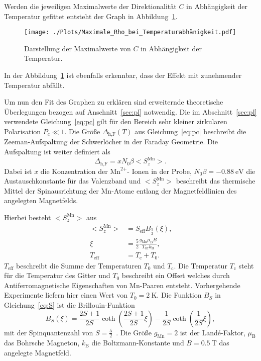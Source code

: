 Werden die jeweiligen Maximalwerte der Direktionalität $C$ in Abhängigkeit
der Temperatur gefittet entsteht der Graph in Abbildung~\ref{fig:fit}.
\begin{figure}
    \centering
    \texttt{[image: ./Plots/Maximale\_Rho\_bei\_Temperaturabhänigkeit.pdf]}
    \caption{Darstellung der Maximalwerte von $C$ in Abhängigkeit der Temperatur.}
    \label{fig:fit}
\end{figure}
\FloatBarrier

In der Abbildung~\ref{fig:fit} ist ebenfalls erkennbar, 
dass der Effekt mit zunehmender Temperatur abfällt.

Um nun den Fit des Graphen zu erklären
sind erweiternde theoretische Überlegungen bezogen auf Anschnitt~\ref{sec:pl} notwendig.
Die im Abschnitt~\ref{sec:pl} verwendete Gleichung~\ref{eq:pc} gilt für den Bereich sehr kleiner zirkularen Polarisation $P_{c}\ll 1$. 
Die Größe $\Delta_\text{h,F}(T)$ aus Gleichung~\ref{eq:pc} beschreibt die 
Zeeman-Aufspaltung der Schwerlöcher in der Faraday Geometrie.
Die Aufspaltung ist weiter definiert als 
\begin{equation}
    \Delta_\text{h,F} = xN_0\beta \bigl< S^\text{Mn}_{z} \bigr>.
\end{equation}
Dabei ist $x$ die Konzentration der $\text{Mn}^\text{2+}\text{- Ionen}$ in der Probe,
$N_0\beta = -\SI{0.88}{\eV}$ die Austauschkonstante für das Valenzband und 
$\bigl< S^\text{Mn}_{z} \bigr>$ beschreibt das thermische Mittel der Spinausrichtung
der Mn-Atome entlang der Magnetfeldlinien des angelegten Magnetfelds.

Hierbei besteht $\bigl< S^\text{Mn}_{z} \bigr>$ aus 
\begin{align}
    \label{eq:S}
    \bigl< S^\text{Mn}_{z} \bigr> &= S_\text{eff} B_\text{$\frac{5}{2}$} (\xi)\text{,}\\
    \xi &= \frac{5}{2}\frac{g_\text{Mn} \mu_\text{B} B }{T_\text{eff} k_\text{B}}\text{,}\\
    \label{eq:S3}
    T_\text{eff} &= T_\text{c} + T_0\text{.} 
\end{align}
$T_\text{eff}$ beschreibt die Summe der Temperaturen $T_0$ und $T_\text{c}$.
Die Temperatur $T_\text{c}$
steht für die Temperatur des Gitter und $T_0$ beschreibt ein Offset welches durch Antiferromagnetische Eigenschaften
von Mn-Paaren entsteht. Vorhergehende Experimente liefern hier einen Wert von $T_0=\SI{2}{\kelvin}$.
Die Funktion $B_{S}$ in Gleichung~\ref{eq:S} ist die Brillouin-Funktion 
\begin{equation}
    B_{S}(\xi) = \frac{2S+1}{2S}\coth\left(\frac{2S+1}{2S}\xi\right) - \frac{1}{2S}\coth(\frac{1}{2S}\xi),
\end{equation}
mit der Spinquantenzahl von $ S = \frac{5}{2}$~\cite{felix}.
Die Größe $g_\text{Mn} = 2 $ ist der Landé-Faktor, $\mu_\text{B}$ das Bohrsche Magneton,
$k_\text{B}$ die Boltzmann-Konstante  und $B=\SI{0,5}{\tesla} $ das angelegte Magnetfeld.


